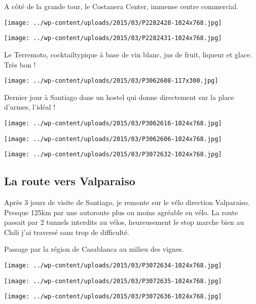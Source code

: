 \pagebreak
A côté de la grande tour, le Costanera Center, immense centre commercial. 
\begin{center} \texttt{[image: ../wp-content/uploads/2015/03/P2282428-1024x768.jpg]} \end{center}
\begin{center} \texttt{[image: ../wp-content/uploads/2015/03/P2282431-1024x768.jpg]} \end{center}

\pagebreak
 Le Terremoto, cocktailtypique à base de vin blanc, jus de fruit, liqueur et glace. Très bon ! 
\begin{center} \texttt{[image: ../wp-content/uploads/2015/03/P3062608-117x300.jpg]} \end{center}

 Dernier jour à Santiago dans un hostel qui donne directement sur la place d'armes, l'idéal ! 
\begin{center} \texttt{[image: ../wp-content/uploads/2015/03/P3062616-1024x768.jpg]} \end{center}
\begin{center} \texttt{[image: ../wp-content/uploads/2015/03/P3062606-1024x768.jpg]} \end{center}
\begin{center} \texttt{[image: ../wp-content/uploads/2015/03/P3072632-1024x768.jpg]} \end{center}

\subsection*{La route vers Valparaiso}

 Après 3 jours de visite de Santiago, je remonte sur le vélo direction Valparaiso. Presque 125km par une autoroute plus ou moins agréable en vélo. La route passait par 2 tunnels interdits au vélos, heureusement le stop marche bien au Chili j'ai traversé sans trop de difficulté. 

 Passage par la région de Casablanca au milieu des vignes. 
\begin{center} \texttt{[image: ../wp-content/uploads/2015/03/P3072634-1024x768.jpg]} \end{center}
\begin{center} \texttt{[image: ../wp-content/uploads/2015/03/P3072635-1024x768.jpg]} \end{center}
\begin{center} \texttt{[image: ../wp-content/uploads/2015/03/P3072636-1024x768.jpg]} \end{center}

